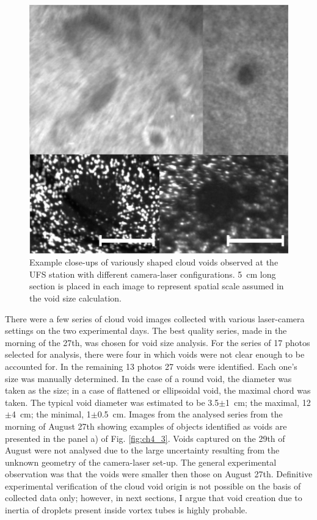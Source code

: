 \documentclass[../main.tex]{subfiles}
\begin{document}
\begin{figure}[h]
\centering
\noindent\includegraphics[width=35pc]{gfx/closeups.png}
\caption{Example close-ups of variously shaped cloud voids observed at the UFS station with different camera-laser configurations. 5~cm long section is placed in each image to represent spatial scale assumed in the void size calculation.}
\label{fig03}
\end{figure}

There were a few series of cloud void images collected with various laser-camera settings on the two experimental days. The best quality series, made in the morning of the 27th, was chosen for void size analysis. For the series of 17 photos selected for analysis, there were four in which voids were not clear enough to be accounted for. In the remaining 13 photos 27 voids were identified. Each one's size was manually determined. In the case of a round void, the diameter was taken as the size; in a case of flattened or ellipsoidal void, the maximal chord was taken. The typical void diameter was estimated to be 3.5$\pm$1~cm; the maximal, 12$\pm$4~cm; the minimal, 1$\pm$0.5~cm. Images from the analysed series from the morning of August 27th showing examples of objects identified as voids are presented in the panel a) of Fig. \ref{fig:ch4_3}. Voids captured on the 29th of August were not analysed due to the large uncertainty resulting from the unknown geometry of the camera-laser set-up. The general experimental observation was that the voids were smaller then those on August 27th. Definitive experimental verification of the cloud void origin is not possible on the basis of collected data only; however, in next sections, I argue that void creation due to inertia of droplets present inside vortex tubes is highly probable.
\end{document}
